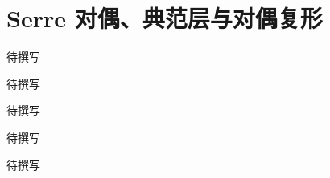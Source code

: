 
% 
% 

\chapter{Serre 对偶、典范层与对偶复形}
\label{g5:ch:22}

\begin{chapterabstract}
待撰写
\end{chapterabstract}

\begin{learninggoals}
待撰写
\end{learninggoals}

待撰写






\begin{chaptersummary}
待撰写
\end{chaptersummary}

\BookExercises
待撰写
